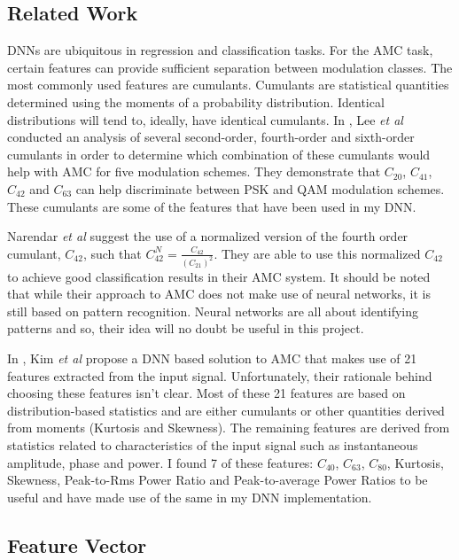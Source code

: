 \documentclass[journal,onecolumn]{IEEEtran}
\begin{document}
\subsection{Related Work}

DNNs are ubiquitous in regression and classification tasks. For the AMC task, certain features can provide sufficient separation between modulation classes. The most commonly used features are cumulants. Cumulants are statistical quantities determined using the moments of a probability distribution. Identical distributions will tend to, ideally, have identical cumulants. In \cite{ann1}, Lee \textit{et al} conducted an analysis of several second-order, fourth-order and sixth-order cumulants in order to determine which combination of these cumulants would help with AMC for five modulation schemes. They demonstrate that $C_{20}$, $C_{41}$, $C_{42}$ and $C_{63}$ can help discriminate between PSK and QAM modulation schemes. These cumulants are some of the features that have been used in my DNN.

Narendar \textit{et al} \cite{c42norm} suggest the use of a normalized version of the fourth order cumulant, $C_{42}$, such that $C^N_{42}=\frac{C_{42}}{\left(C_{21}\right)^2}$. They are able to use this normalized $C_{42}$ to achieve good classification results in their AMC system. It should be noted that while their approach to AMC does not make use of neural networks, it is still based on pattern recognition. Neural networks are all about identifying patterns and so, their idea will no doubt be useful in this project.

In \cite{ann2}, Kim \textit{et al} propose a DNN based solution to AMC that makes use of 21 features extracted from the input signal. Unfortunately, their rationale behind choosing these features isn't clear. Most of these 21 features are based on distribution-based statistics and are either cumulants or other quantities derived from moments (Kurtosis and Skewness). The remaining features are derived from statistics related to characteristics of the input signal such as instantaneous amplitude, phase and power. I found 7 of these features: $C_{40}$, $C_{63}$, $C_{80}$, Kurtosis, Skewness, Peak-to-Rms Power Ratio and Peak-to-average Power Ratios to be useful and have made use of the same in my DNN implementation.

\subsection{Feature Vector}
\end{document}
